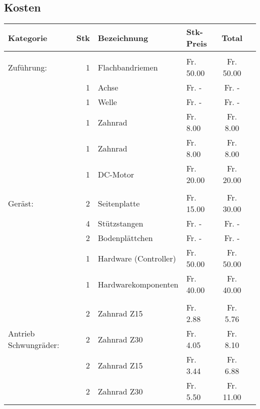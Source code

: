 \subsection{Kosten}
    \begin{longtable}{p{1.7cm}rllcc}
    \textbf{Kategorie} & \textbf{Stk} & \textbf{Bezeichnung} & \textbf{Stk-Preis}
    & \textbf{Total} \\
    \hline     &       &                              &            &            \\
    Zuführung: & 1     & Flachbandriemen 	          &  Fr. 50.00 &  Fr. 50.00 \\
               & 1     & Achse          	          &  Fr. -     &  Fr. -     \\
               & 1     & Welle                     	  &  Fr. -     &  Fr. -     \\
               & 1     & Zahnrad         	          &  Fr. 8.00  &  Fr. 8.00  \\
               & 1     & Zahnrad         	          &  Fr. 8.00  &  Fr. 8.00  \\
               & 1     & DC-Motor        	          &  Fr. 20.00 &  Fr. 20.00 \\
               &       &                 	          &            &            \\
       Geräst: & 2     & Seitenplatte    	          &  Fr. 15.00 &  Fr. 30.00 \\
               & 4     & Stützstangen    	          &  Fr. -     &  Fr. -     \\
               & 2     & Bodenplättchen  	          &  Fr. -     &  Fr. -     \\
               & 1     & Hardware (Controller)        &  Fr. 50.00 &  Fr. 50.00 \\
               & 1     & Hardwarekomponenten          &  Fr. 40.00 &  Fr. 40.00 \\
               &       &       				          &      	   &            \\
   \multirow{3}{1.7cm}{Antrieb Schwungräder:}  
               & 2     & Zahnrad Z15                  &  Fr. 2.88  &  Fr. 5.76  \\
               & 2     & Zahnrad Z30 	              &  Fr. 4.05  &  Fr. 8.10  \\
               & 2     & Zahnrad Z15 	        	  &  Fr. 3.44  &  Fr. 6.88  \\
               & 2     & Zahnrad Z30 	         	  &  Fr. 5.50  &  Fr. 11.00 \\

\end{longtable}
